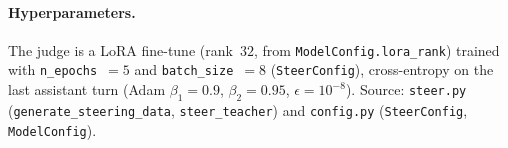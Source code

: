 \paragraph{Hyperparameters.} The judge is a LoRA fine-tune (rank~$32$, from \texttt{ModelConfig.lora\_rank}) trained with \texttt{n\_epochs}~$=5$ and \texttt{batch\_size}~$=8$ (\texttt{SteerConfig}), cross-entropy on the last assistant turn (Adam $\beta_1{=}0.9$, $\beta_2{=}0.95$, $\epsilon{=}10^{-8}$). Source: \texttt{steer.py} (\texttt{generate\_steering\_data}, \texttt{steer\_teacher}) and \texttt{config.py} (\texttt{SteerConfig}, \texttt{ModelConfig}).
